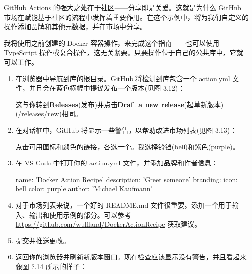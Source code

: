 GitHub Actions 的强大之处在于社区——分享即是关爱。这就是为什么 GitHub 市场在赋能基于社区的流程中发挥着重要作用。在这个示例中，将为我们自定义的操作添加品牌和其他元数据，并在市场中分享。


我将使用之前创建的 Docker 容器操作，来完成这个指南——也可以使用 TypeScript 操作或复合操作，这无关紧要。只要操作位于自己的公共库中，它就可以工作。


\begin{enumerate}
\item 
在浏览器中导航到库的根目录。GitHub 将检测到库包含一个 action.yml 文件，并且会在蓝色横幅中提议发布一个版本(见图 3.12)：


这与你转到\textbf{Releases}(发布)并点击\textbf{Draft a new release}(起草新版本)(/releases/new)相同。

\item 
在对话框中，GitHub 将显示一些警告，以帮助改进市场列表(见图 3.13)：


点击可用图标和颜色的链接，各选一个。我选择铃铛(bell)和紫色(purple)。

\item 
在 VS Code 中打开你的 action.yml 文件，并添加品牌和作者信息：

\begin{shell}
name: 'Docker Action Recipe'
description: 'Greet someone'
branding:
  icon: bell
  color: purple
author: 'Michael Kaufmann'
\end{shell}

\item 
对于市场列表来说，一个好的 README.md 文件很重要。添加一个用于输入、输出和使用示例的部分。可以参考 \url{https://github.com/wulfland/DockerActionRecipe} 获取建议。

\item 
提交并推送更改。

\item 
返回你的浏览器并刷新新版本窗口。现在检查应该显示没有警告，并且看起来像图 3.14 所示的样子：



\end{enumerate}
